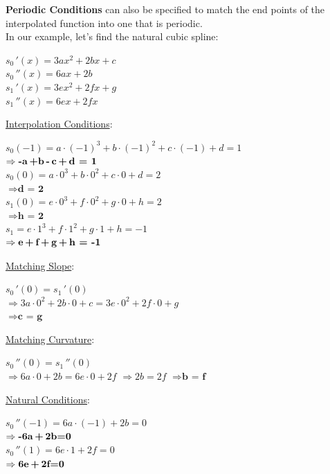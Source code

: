 \documentclass[a4paper,12pt,]{report}
\begin{document}
	\textbf{Periodic Conditions} can also be specified to match the end points of the interpolated function into one that
	is periodic.\\

	In our example, let's find the natural cubic spline:
\begin{center}
	$s_0\,'(x)=3ax^2+2bx+c$\\
	$s_0\,''(x)=6ax+2b$\\
	$s_1\,'(x)=3ex^2+2fx+g$\\
	$s_1\,''(x)=6ex+2fx$\\
\end{center}

\underline{Interpolation Conditions}:
\begin{center}
	$s_0(-1) = a\cdot(-1)^3+b\cdot(-1)^2+c\cdot(-1)+d = 1$\\
	\medskip
	$\Rightarrow \textbf{-a\,+b\,-\,c\,+\,d = 1}$\\
	\bigskip
	$s_0(0) = a \cdot 0^3 + b \cdot 0^2 + c \cdot 0 + d = 2$\\
	\medskip
	$\Rightarrow \textbf{d = 2}$\\
	\bigskip
	$s_1(0) = e \cdot 0^3 + f \cdot 0^2 + g \cdot 0 + h = 2$\\
	\medskip
	$\Rightarrow \textbf{h = 2}$\\
	\bigskip
	$s_1 = e\cdot1^3+f\cdot1^2+g\cdot1+h = -1$\\
	\medskip
	$\Rightarrow \textbf{e\,+\,f\,+\,g\,+\,h = -1}$
\end{center}

\underline{Matching Slope}:
\begin{center}
	$s_0\,'(0) = s_1\,'(0)$\\
	\medskip
	$\Rightarrow 3a \cdot 0^2 + 2b \cdot 0 + c = 3e \cdot 0^2 + 2f \cdot 0 + g$\\
	\medskip
	$\Rightarrow \textbf{c = g}$
\end{center}

\underline{Matching Curvature}:
\begin{center}
	$s_0\,''(0) = s_1\,''(0)$\\
	\medskip
	$\Rightarrow 6a \cdot 0 + 2b = 6e \cdot 0 + 2f$
	\medskip
	$\Rightarrow 2b = 2f$
	\medskip
	$\Rightarrow \textbf{b = f}$
\end{center}

\underline{Natural Conditions}:
\begin{center}
	$s_0\,''(-1) = 6a \cdot (-1) + 2b = 0$\\
	\medskip
	$\Rightarrow \textbf{-6a\,+\,2b=0}$\\
	\bigskip
	$s_0\,''(1) = 6e \cdot 1 + 2f = 0$\\
	\medskip
	$\Rightarrow \textbf{6e\,+\,2f=0}$
\end{center}
\end{document}
